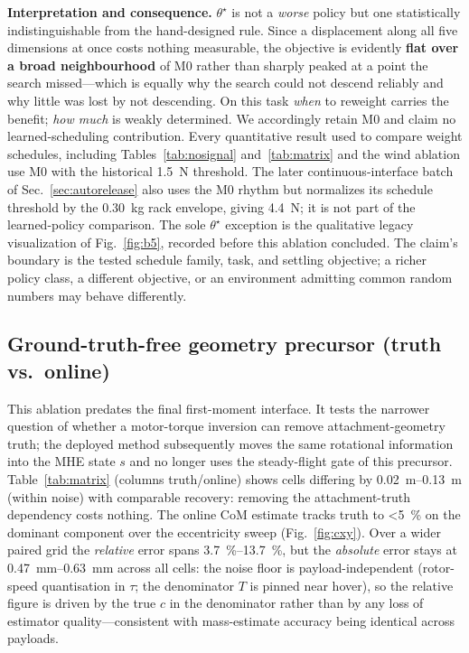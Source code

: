 \textbf{Interpretation and consequence.} $\theta^\star$ is not a \emph{worse} policy but one
statistically indistinguishable from the hand-designed rule. Since a displacement along all
five dimensions at once costs nothing measurable, the objective is evidently \textbf{flat over
a broad neighbourhood} of M0 rather than sharply peaked at a point the search missed---which is
equally why the search could not descend reliably and why little was lost by not descending. On
this task \emph{when} to reweight carries the benefit; \emph{how much} is weakly determined. We
accordingly retain M0 and claim no learned-scheduling contribution. Every quantitative result
used to compare weight schedules, including
Tables~\ref{tab:nosignal} and~\ref{tab:matrix} and the wind ablation use M0 with the historical
\SI{1.5}{N} threshold. The later continuous-interface batch of
Sec.~\ref{sec:autorelease} also uses the M0 rhythm but normalizes its schedule threshold by the
\SI{0.30}{kg} rack envelope, giving \SI{4.4}{N}; it is not part of the learned-policy
comparison. The sole $\theta^\star$ exception is the qualitative legacy visualization of
Fig.~\ref{fig:b5}, recorded before this ablation concluded. The claim's boundary is the tested
schedule family, task, and settling objective; a richer policy class, a different objective,
or an environment admitting common random numbers may behave differently.

\subsection{Ground-truth-free geometry precursor (truth vs.\ online)}
This ablation predates the final first-moment interface. It tests the narrower question of
whether a motor-torque inversion can remove attachment-geometry truth; the deployed method
subsequently moves the same rotational information into the MHE state $s$ and no longer uses
the steady-flight gate of this precursor.
Table~\ref{tab:matrix} (columns truth/online) shows cells differing by
\SIrange{0.02}{0.13}{m} (within noise) with comparable recovery: removing the attachment-truth
dependency costs nothing. The online CoM estimate tracks truth to \SI{<5}{\percent} on the
dominant component over the eccentricity sweep (Fig.~\ref{fig:cxy}). Over a wider paired
grid the \emph{relative} error spans \SIrange{3.7}{13.7}{\percent}, but the \emph{absolute}
error stays at \SIrange{0.47}{0.63}{mm} across all cells: the noise floor is
payload-independent (rotor-speed quantisation in $\tau$; the denominator $T$ is pinned near
hover), so the relative figure is driven by the true $c$ in the denominator rather than by any
loss of estimator quality---consistent with mass-estimate accuracy being identical across
payloads.

